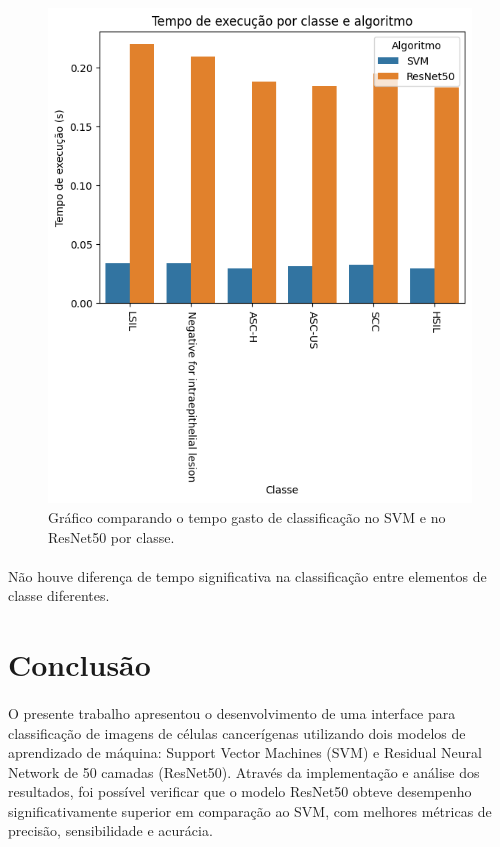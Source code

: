 \documentclass[12pt]{article}
\begin{document}
\begin{figure}[H]
    \centering
    \includegraphics{ResNet50 vs SVM por classe.png}
    \caption{Gráfico comparando o tempo gasto de classificação no SVM e no ResNet50 por classe.}
    \label{fig:grafico-svm-vs-resnet-tempo-por-classe}
\end{figure}

\paragraph{}Não houve diferença de tempo significativa na classificação entre elementos de classe diferentes.

\section{Conclusão}
\paragraph{}O presente trabalho apresentou o desenvolvimento de uma interface para classificação de imagens de células cancerígenas utilizando dois modelos de aprendizado de máquina: Support Vector Machines (SVM) e Residual Neural Network de 50 camadas (ResNet50). Através da implementação e análise dos resultados, foi possível verificar que o modelo ResNet50 obteve desempenho significativamente superior em comparação ao SVM, com melhores métricas de precisão, sensibilidade e acurácia.
\end{document}
